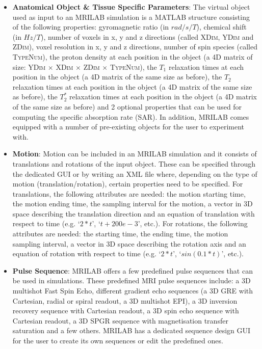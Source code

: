 \begin{itemize}
    
    \item \textbf{Anatomical Object \& Tissue Specific Parameters}: The virtual object used as input to an MRILAB simulation is a MATLAB structure consisting of the following properties:
    gyromagnetic ratio (in $rad/s/T$), 
    chemical shift (in $Hz/T$), 
    number of voxels in x, y and z directions (called \textsc{XDim}, \textsc{YDim} and \textsc{ZDim}),
    voxel resolution in x, y and z directions, 
    number of spin species (called \textsc{TypeNum}),
    the proton density at each position in the object (a 4D matrix of size: \textsc{YDim $\times$ XDim $\times$ ZDim $\times$ TypeNum}), 
    the $T_1$ relaxation times at each position in the object (a 4D matrix of the same size as before), 
    the $T_2$ relaxation times at each position in the object (a 4D matrix of the same size as before),
    the $T_2^*$ relaxation times at each position in the object (a 4D matrix of the same size as before) and 
    2 optional properties that can be used for computing the specific absorption rate (SAR).
    In addition, MRILAB comes equipped with a number of pre-existing objects for the user to experiment with.
    
    \item \textbf{Motion}: Motion can be included in an MRILAB simulation and it consists of translations and rotations of the input object.
    These can be specified through the dedicated GUI or by writing an XML file where, depending on the type of motion (translation/rotation), certain properties need to be specified. 
    For translations, the following attributes are needed:
    the motion starting time,
    the motion ending time,
    the sampling interval for the motion,
    a vector in 3D space describing the translation direction
    and an equation of translation with respect to time (e.g. `$2*t$', `$t+200e-3$', etc.).
    For rotations, the following attributes are needed:
    the starting time,
    the ending time,
    the motion sampling interval,
    a vector in 3D space describing the rotation axis and
    an equation of rotation with respect to time (e.g. `$2*t$', `$sin(0.1*t)$', etc.).
    
    \item \textbf{Pulse Sequence}: MRILAB offers a few predefined pulse sequences that can be used in simulations.
    These predefined MRI pulse sequences include: 
    a 3D multishot Fast Spin Echo,
    different gradient echo sequences (a 3D GRE with Cartesian, radial or spiral readout, a 3D multishot EPI),
    a 3D inversion recovery sequence with Cartesian readout, 
    a 3D spin echo sequence with Cartesian readout,
    a 3D SPGR sequence with magnetisation transfer saturation and a few others.
    MRILAB has a dedicated sequence design GUI for the user to create its own sequences or edit the predefined ones.
    

\end{itemize}
